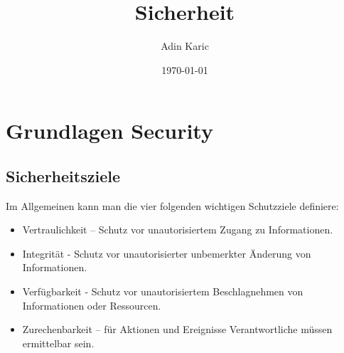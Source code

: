 \documentclass[11pt]{scrartcl}
\title{Sicherheit}
\author{Adin Karic}
\date{\today{}}
\begin{document}
\maketitle
\pagebreak
\tableofcontents
\pagebreak

\section{Grundlagen Security}
\label{sec:basics-security-process}

\subsection{Sicherheitsziele}
\label{sec:security goals}
Im Allgemeinen kann man die vier folgenden wichtigen Schutzziele definiere\cite{1}:\\
\begin{itemize}
\item Vertraulichkeit – Schutz vor unautorisiertem Zugang zu Informationen.
\item Integrität - Schutz vor unautorisierter unbemerkter Änderung von Informationen.
\item Verfügbarkeit - Schutz vor unautorisiertem Beschlagnehmen von Informationen oder Ressourcen.
\item Zurechenbarkeit – für Aktionen und Ereignisse Verantwortliche müssen ermittelbar sein.
\end{itemize}
\end{document}
